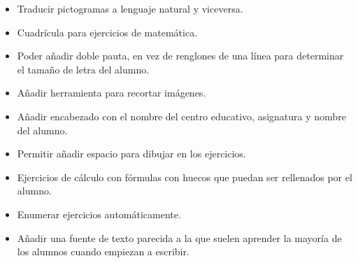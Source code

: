 \begin{itemize}
    \item Traducir pictogramas a lenguaje natural y viceversa.
    \item Cuadrícula para ejercicios de matemática.
    \item Poder añadir doble pauta, en vez de renglones de una línea para determinar el tamaño de letra del alumno.
    \item Añadir herramienta para recortar imágenes.
    \item Añadir encabezado con el nombre del centro educativo, asignatura y nombre del alumno.
    \item Permitir añadir espacio para dibujar en los ejercicios.
    \item Ejercicios de cálculo con fórmulas con huecos que puedan ser rellenados por el alumno.
    \item Enumerar ejercicios automáticamente.
    \item Añadir una fuente de texto parecida a la que suelen aprender la mayoría de los alumnos cuando empiezan a escribir.
\end{itemize}